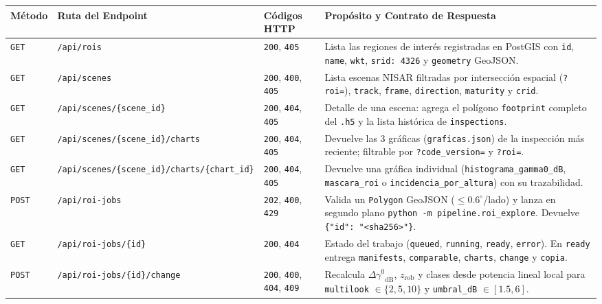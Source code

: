\documentclass[11pt,a4paper]{article}
\newcommand{\gz}{\ensuremath{\gamma^{0}}}
\begin{document}
\begin{table}[htbp]
\centering
\footnotesize
\begin{tabular}{lp{4.3cm}p{2.3cm}p{6.6cm}}
\toprule
\textbf{Método} & \textbf{Ruta del Endpoint} & \textbf{Códigos HTTP} & \textbf{Propósito y Contrato de Respuesta} \\
\midrule
\texttt{GET} & \texttt{/api/rois} & \texttt{200}, \texttt{405} & Lista las regiones de interés registradas en PostGIS con \texttt{id}, \texttt{name}, \texttt{wkt}, \texttt{srid: 4326} y \texttt{geometry} GeoJSON. \\
\texttt{GET} & \texttt{/api/scenes} & \texttt{200}, \texttt{400}, \texttt{405} & Lista escenas NISAR filtradas por intersección espacial (\texttt{?roi=}), \texttt{track}, \texttt{frame}, \texttt{direction}, \texttt{maturity} y \texttt{crid}. \\
\texttt{GET} & \texttt{/api/scenes/\{scene\_id\}} & \texttt{200}, \texttt{404}, \texttt{405} & Detalle de una escena: agrega el polígono \texttt{footprint} completo del \texttt{.h5} y la lista histórica de \texttt{inspections}. \\
\texttt{GET} & \texttt{/api/scenes/\{scene\_id\}/charts} & \texttt{200}, \texttt{404}, \texttt{405} & Devuelve las 3 gráficas (\texttt{graficas.json}) de la inspección más reciente; filtrable por \texttt{?code\_version=} y \texttt{?roi=}. \\
\texttt{GET} & \texttt{/api/scenes/\{scene\_id\}/charts/\{chart\_id\}} & \texttt{200}, \texttt{404}, \texttt{405} & Devuelve una gráfica individual (\texttt{histograma\_gamma0\_dB}, \texttt{mascara\_roi} o \texttt{incidencia\_por\_altura}) con su trazabilidad. \\
\midrule
\texttt{POST} & \texttt{/api/roi-jobs} & \texttt{202}, \texttt{400}, \texttt{429} & Valida un \texttt{Polygon} GeoJSON ($\le 0.6^\circ$/lado) y lanza en segundo plano \texttt{python -m pipeline.roi\_explore}. Devuelve \texttt{\{"id": "<sha256>"\}}. \\
\texttt{GET} & \texttt{/api/roi-jobs/\{id\}} & \texttt{200}, \texttt{404} & Estado del trabajo (\texttt{queued}, \texttt{running}, \texttt{ready}, \texttt{error}). En \texttt{ready} entrega \texttt{manifests}, \texttt{comparable}, \texttt{charts}, \texttt{change} y \texttt{copia}. \\
\texttt{POST} & \texttt{/api/roi-jobs/\{id\}/change} & \texttt{200}, \texttt{400}, \texttt{404}, \texttt{409} & Recalcula $\Delta\gz_{\mathrm{dB}}$, $z_{\mathrm{rob}}$ y clases desde potencia lineal local para \texttt{multilook} $\in \{2,5,10\}$ y \texttt{umbral\_dB} $\in [1.5, 6]$. \\

\end{tabular}
\end{table}
\end{document}

